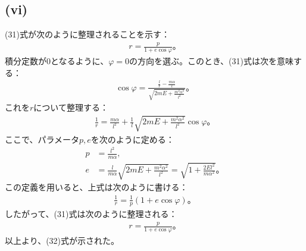   \subsection*{(vi)}
  (31)式が次のように整理されることを示す：
  \begin{align*}
    r=\frac{p}{1+e\cos\varphi}。\tag{32}
  \end{align*}
  積分定数が0となるように、$\varphi=0$の方向を選ぶ。このとき、(31)式は次を意味する：
  \begin{align*}
    \cos\varphi=\frac{\frac{l}{r}-\frac{m\alpha}{l}}{\sqrt{2mE+\frac{m^2\alpha^2}{l^2}}}。
  \end{align*}
  これを$r$について整理する：
  \begin{align*}
    \frac{1}{r}=\frac{m\alpha}{l^2}+\frac{1}{l}\sqrt{2mE+\frac{m^2\alpha^2}{l^2}}\cos\varphi。
  \end{align*}
  ここで、パラメータ$p,e$を次のように定める：
  \begin{align*}
    p&=\frac{l^2}{m\alpha},\tag{33}\\
    e&=\frac{l}{m\alpha}\sqrt{2mE+\frac{m^2\alpha^2}{l^2}}=\sqrt{1+\frac{2El^2}{m\alpha^2}}。\tag{34}
  \end{align*}
  この定義を用いると、上式は次のように書ける：
  \begin{align*}
    \frac{1}{r}=\frac{1}{p}(1+e\cos\varphi)。
  \end{align*}
  したがって、(31)式は次のように整理される：
  \begin{align*}
    r=\frac{p}{1+e\cos\varphi}。
  \end{align*}
  以上より、(32)式が示された。


